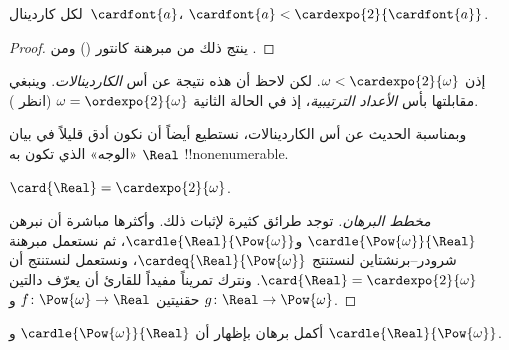 \documentclass[../../../include/open-logic-section]{subfiles}
\begin{document}
\begin{cor}
لكل كاردينال~$\cardfont{a}$،
$\cardfont{a} < \cardexpo{2}{\cardfont{a}}$.
\end{cor}

\begin{proof}
ينتج ذلك من مبرهنة كانتور () ومن
.
\end{proof}
\noindent
إذن $\omega < \cardexpo{2}{\omega}$. لكن لاحظ أن هذه نتيجة عن أس
\emph{الكاردينالات}. وينبغي مقابلتها بأس \emph{الأعداد الترتيبية}، إذ
في الحالة الثانية $\omega = \ordexpo{2}{\omega}$ (انظر
).

وبمناسبة الحديث عن أس الكاردينالات، نستطيع أيضاً أن نكون أدق قليلاً في
بيان «الوجه» الذي تكون به $\Real$ !!{nonenumerable}.

\begin{thm}
$\card{\Real} = \cardexpo{2}{\omega}$.
\end{thm}

\begin{proof}[مخطط البرهان]
توجد طرائق كثيرة لإثبات ذلك. وأكثرها مباشرة أن نبرهن
$\cardle{\Pow{\omega}}{\Real}$ و$\cardle{\Real}{\Pow{\omega}}$، ثم
نستعمل مبرهنة شرودر--برنشتاين لنستنتج
$\cardeq{\Real}{\Pow{\omega}}$، ونستعمل
 لنستنتج أن
$\card{\Real} = \cardexpo{2}{\omega}$. ونترك تمريناً مفيداً للقارئ أن
يعرّف دالتين حقنيتين $f \colon \Pow{\omega} \to \Real$ و
$g \colon \Real \to \Pow{\omega}$.
\end{proof}

\begin{prob}
أكمل برهان  بإظهار
أن $\cardle{\Pow{\omega}}{\Real}$ و
$\cardle{\Real}{\Pow{\omega}}$.
\end{prob}
\end{document}
